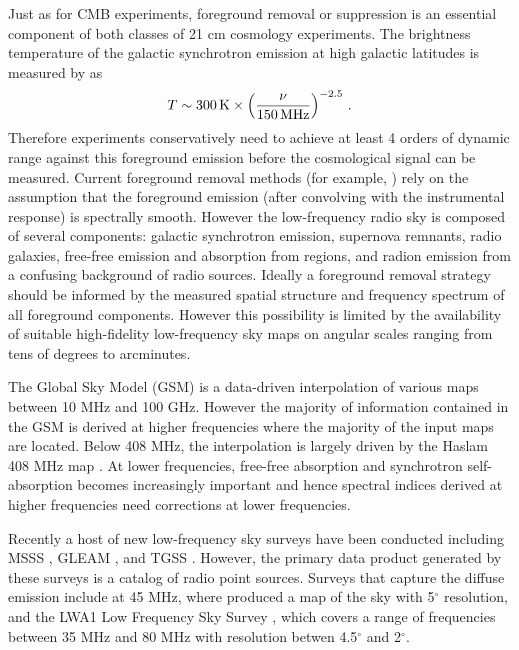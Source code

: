 \documentclass[twocolumn]{aastex61}
\begin{document}
Just as for CMB experiments, foreground removal or suppression is an essential component of both
classes of 21 cm cosmology experiments. The brightness temperature of the galactic synchrotron
emission at high galactic latitudes is measured by \citet{2008AJ....136..641R} as
\begin{equation}
    T \sim 300\,{\rm K} \times \left(\frac{\nu}{150\,{\rm MHz}}\right)^{-2.5}\,.
\end{equation}
Therefore experiments conservatively need to achieve at least 4 orders of dynamic range against this
foreground emission before the cosmological signal can be measured. Current foreground removal
methods (for example, \citealt{2012ApJ...756..165P}) rely on the assumption that the foreground
emission (after convolving with the instrumental response) is spectrally smooth. However the
low-frequency radio sky is composed of several components: galactic synchrotron emission, supernova
remnants, radio galaxies, free-free emission and absorption from  regions, and radion
emission from a confusing background of radio sources.  Ideally a foreground removal strategy should
be informed by the measured spatial structure and frequency spectrum of all foreground components.
However this possibility is limited by the availability of suitable high-fidelity low-frequency sky
maps on angular scales ranging from tens of degrees to arcminutes.

The Global Sky Model (GSM) \citep{2008MNRAS.388..247D, 2017MNRAS.464.3486Z} is a data-driven
interpolation of various maps between 10 MHz and 100 GHz. However the majority of information
contained in the GSM is derived at higher frequencies where the majority of the input maps are
located.  Below 408 MHz, the interpolation is largely driven by the Haslam 408 MHz map
\citep{1981A&A...100..209H, 1982A&AS...47....1H}.  At lower frequencies, free-free absorption and
synchrotron self-absorption becomes increasingly important and hence spectral indices derived at
higher frequencies need corrections at lower frequencies.

Recently a host of new low-frequency sky surveys have been conducted including MSSS
\citep{2015A&A...582A.123H}, GLEAM \citep{2015PASA...32...25W}, and TGSS
\citep{2017A&A...598A..78I}. However, the primary data product generated by these surveys is a
catalog of radio point sources. Surveys that capture the diffuse emission include at 45 MHz, where
\citet{2011A&A...525A.138G} produced a map of the sky with 5$^\circ$ resolution, and the LWA1 Low
Frequency Sky Survey \citet{2017MNRAS.469.4537D}, which covers a range of frequencies between 35 MHz
and 80 MHz with resolution betwen 4.5$^\circ$ and 2$^\circ$.
\end{document}
